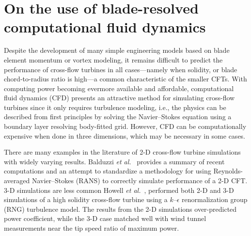 \chapter{On the use of blade-resolved computational fluid
    dynamics}\label{chap:CFD}

Despite the development of many simple engineering models based on blade element
momentum or vortex modeling, it remains difficult to predict the performance of
cross-flow turbines in all cases---namely when solidity, or blade
chord-to-radius ratio is high---a common characteristic of the smaller CFTs.
With computing power becoming evermore available and affordable, computational
fluid dynamics (CFD) presents an attractive method for simulating cross-flow
turbines since it only requires turbulence modeling, i.e., the physics can be
described from first principles by solving the Navier--Stokes equation using a
boundary layer resolving body-fitted grid. However, CFD can be computationally
expensive when done in three dimensions, which may be necessary in some cases.

There are many examples in the literature of 2-D cross-flow turbine simulations
with widely varying results. Balduzzi \emph{et al.}~\cite{Balduzzi2016} provides
a summary of recent computations and an attempt to standardize a methodology for
using Reynolds-averaged Navier--Stokes (RANS) to correctly simulate performance
of a 2-D CFT. 3-D simulations are less common  Howell \emph{et al.}~\cite{Howell2010}, performed both
2-D and 3-D simulations of a high solidity cross-flow turbine using a
$k$--$\epsilon$ renormalization group (RNG) turbulence model. The results from
the 2-D simulations over-predicted power coefficient, while the 3-D case matched
well with wind tunnel measurements near the tip speed ratio of maximum power.

